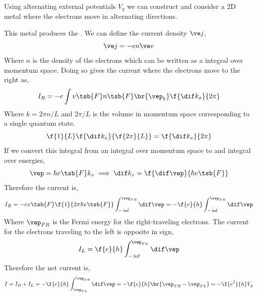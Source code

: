 \documentclass{article}
\begin{document}
Using alternating external potentials $V_y$ we can construct and consider a 2D metal where the electrons move in alternating directions.
\begin{center}
\end{center}
This metal produces the . We can define the current density $\ve j$,
\[ \ve j = - e n \ve v \]
Where $n$ is the density of the electrons which can be written as a integral over momentum space.
Doing so gives the current where the electrons move to the right as,
\[ I_R = - e \int v\tsb{F} n\tsb{F}\br{\vep_k} \f{\dif k_x}{2 \pi} \]
Where $k = 2\pi n / L$ and $2\pi / L$ is the volume in momentum space corresponding to a single quantum state.
\[ \f{1}{L} \f{\dif k_x}{\f{2 \pi }{L}} = \f{\dif k_x}{2 \pi} \]
If we convert this integral from an integral over momentum space to and integral over energies,
\[ \vep = \hbar v\tsb{F} k_x \implies \dif k_x = \f{\dif \vep}{\hbar v\tsb{F}} \]
Therefore the current is,
\[ I_{R} = - e v\tsb{F}  \f{1}{2\pi \hbar v\tsb{F}} \int_{-\inf}^{\vep_{FR}} \dif \vep = - \f{e}{h} \int_{-\inf}^{\vep_{FR}} \dif \vep \]
Where $\vep_{FR}$ is the Fermi energy for the right-traveling electrons.
The current for the electrons traveling to the left is opposite in sign,
\[ I_L = \f{e}{h} \int_{-\inf}^{\vep_{FL}} \dif \vep \]
Therefore the net current is,
\[ I = I_{R} + I_{L} = - \f{e}{h} \int_{\vep_{FL}}^{\vep_{FR}} \dif \vep = - \f{e}{h} \br{\vep_{FR} - \vep_{FL}} = - \f{e^2}{h} V_{y} \]
\end{document}
